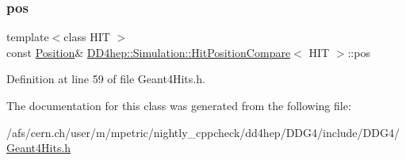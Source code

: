 \subsubsection{\texorpdfstring{pos}{pos}}
{\footnotesize\ttfamily template$<$class H\+IT $>$ \\
const \hyperlink{namespace_d_d4hep_1_1_geometry_a55083902099d03506c6db01b80404900}{Position}\& \hyperlink{struct_d_d4hep_1_1_simulation_1_1_hit_position_compare}{D\+D4hep\+::\+Simulation\+::\+Hit\+Position\+Compare}$<$ H\+IT $>$\+::pos}



Definition at line 59 of file Geant4\+Hits.\+h.



The documentation for this class was generated from the following file\+:\begin{DoxyCompactItemize}
\item 
/afs/cern.\+ch/user/m/mpetric/nightly\+\_\+cppcheck/dd4hep/\+D\+D\+G4/include/\+D\+D\+G4/\hyperlink{_geant4_hits_8h}{Geant4\+Hits.\+h}\end{DoxyCompactItemize}
